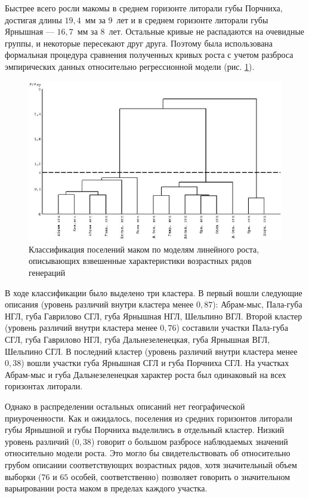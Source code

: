Быстрее   всего   росли   макомы   в   среднем   горизонте   литорали   губы Порчниха, достигая длины $19,4$~мм за $9$~лет и в среднем горизонте литорали губы Ярнышная --- $16,7$~мм за $8$~лет. 
Остальные кривые не распадаются на очевидные группы, и некоторые пересекают   друг   друга.   
Поэтому   была   использована   формальная   процедура   сравнения полученных   кривых   роста   с   учетом   разброса   эмпирических   данных   относительно регрессионной модели (рис. \ref{ris:dendrogramma_linear_all_gorizonts}).
    \begin{figure}
        \includegraphics[width=\textwidth]{../Barenc_Sea/growth_from_MSc/dendrogramma_sravnenie_rosta_linear_all_gorizonts.jpg}
    \caption{Классификация поселений маком по моделям линейного роста, описывающих взвешенные характеристики возрастных рядов генераций}
    \label{ris:dendrogramma_linear_all_gorizonts}
    \end{figure}

В   ходе   классификации   было   выделено   три   кластера.   
В   первый   вошли   следующие описания (уровень различий внутри кластера менее $0,87$): Абрам-мыс, Пала-губа НГЛ, губа Гаврилово   СГЛ,   губа   Ярнышная   НГЛ,   Шельпино   ВГЛ.   
Второй   кластер   (уровень   различий внутри кластера менее $0,76$) составили участки Пала-губа СГЛ, губа Гаврилово НГЛ, губа Дальнезеленецкая,   губа   Ярнышная   ВГЛ,   Шельпино   СГЛ.   
В   последний   кластер   (уровень различий внутри кластера менее $0,38$) вошли участки губа Ярнышная СГЛ и губа Порчниха СГЛ. 
На участках Абрам-мыс и губа Дальнезеленецкая характер роста был одинаковый на всех горизонтах литорали. 

Однако в распределении остальных описаний нет географической приуроченности. 
Как и ожидалось, поселения  из средних горизонтов литорали губы Ярнышной и губы Порчниха   выделились   в   отдельный   кластер.   
Низкий   уровень   различий   ($0,38$)   говорит   о большом   разбросе   наблюдаемых   значений   относительно   модели   роста.   
Это   могло   бы свидетельствовать   об   относительно   грубом   описании   соответствующих   возрастных   рядов, хотя   значительный объем  выборки ($76$  и $65$  особей, соответственно)  позволяет  говорить  о значительном варьировании роста маком в пределах каждого участка.

